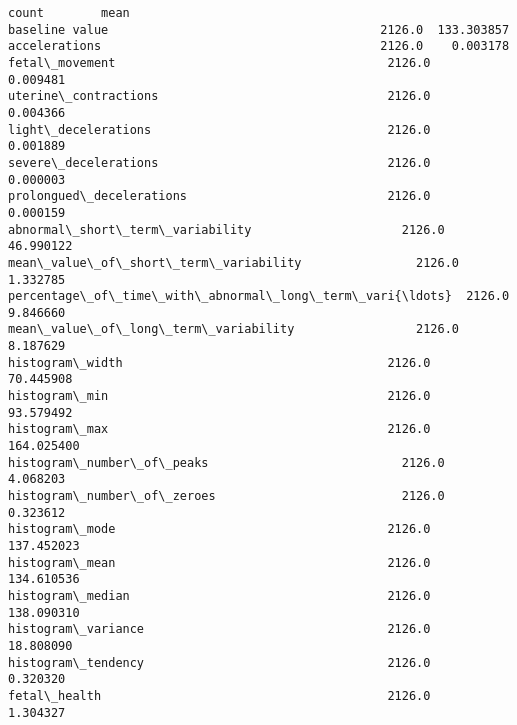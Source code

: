 \documentclass[11pt]{article}
\makeatletter
\newcommand{\boxspacing}{\kern\kvtcb@left@rule\kern\kvtcb@boxsep}
\makeatother
\begin{document}
            \begin{tcolorbox}[breakable, size=fbox, boxrule=.5pt, pad at break*=1mm, opacityfill=0]
{\boxspacing}
\begin{Verbatim}[commandchars=\\\{\}]
                                                     count        mean  
baseline value                                      2126.0  133.303857
accelerations                                       2126.0    0.003178
fetal\_movement                                      2126.0    0.009481
uterine\_contractions                                2126.0    0.004366
light\_decelerations                                 2126.0    0.001889
severe\_decelerations                                2126.0    0.000003
prolongued\_decelerations                            2126.0    0.000159
abnormal\_short\_term\_variability                     2126.0   46.990122
mean\_value\_of\_short\_term\_variability                2126.0    1.332785
percentage\_of\_time\_with\_abnormal\_long\_term\_vari{\ldots}  2126.0    9.846660
mean\_value\_of\_long\_term\_variability                 2126.0    8.187629
histogram\_width                                     2126.0   70.445908
histogram\_min                                       2126.0   93.579492
histogram\_max                                       2126.0  164.025400
histogram\_number\_of\_peaks                           2126.0    4.068203
histogram\_number\_of\_zeroes                          2126.0    0.323612
histogram\_mode                                      2126.0  137.452023
histogram\_mean                                      2126.0  134.610536
histogram\_median                                    2126.0  138.090310
histogram\_variance                                  2126.0   18.808090
histogram\_tendency                                  2126.0    0.320320
fetal\_health                                        2126.0    1.304327


\end{Verbatim}
\end{tcolorbox}
\end{document}
